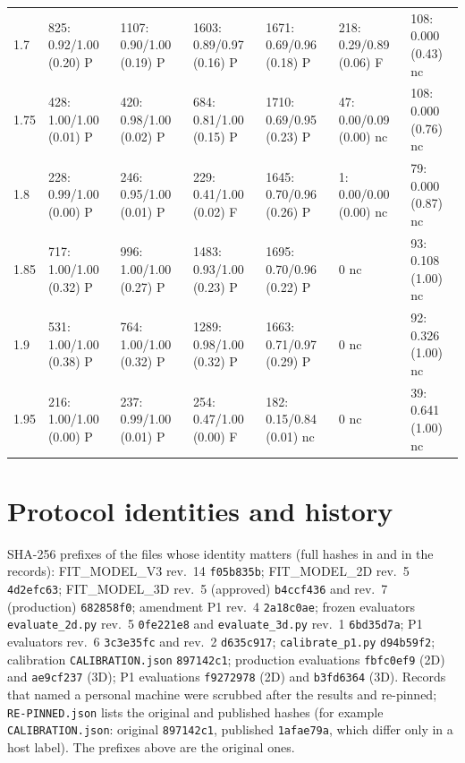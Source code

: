 \documentclass[10pt,a4paper]{article}
\newcommand{\code}[1]{\texttt{#1}}
\begin{document}
\begin{table}
\begin{tabular}{@{}lllllll@{}}
1.7 & 825: 0.92/1.00 (0.20) P & 1107: 0.90/1.00 (0.19) P & 1603: 0.89/0.97 (0.16) P & 1671: 0.69/0.96 (0.18) P & 218: 0.29/0.89 (0.06) F & 108: 0.000 (0.43) nc \\
1.75 & 428: 1.00/1.00 (0.01) P & 420: 0.98/1.00 (0.02) P & 684: 0.81/1.00 (0.15) P & 1710: 0.69/0.95 (0.23) P & 47: 0.00/0.09 (0.00) nc & 108: 0.000 (0.76) nc \\
1.8 & 228: 0.99/1.00 (0.00) P & 246: 0.95/1.00 (0.01) P & 229: 0.41/1.00 (0.02) F & 1645: 0.70/0.96 (0.26) P & 1: 0.00/0.00 (0.00) nc & 79: 0.000 (0.87) nc \\
1.85 & 717: 1.00/1.00 (0.32) P & 996: 1.00/1.00 (0.27) P & 1483: 0.93/1.00 (0.23) P & 1695: 0.70/0.96 (0.22) P & 0 nc & 93: 0.108 (1.00) nc \\
1.9 & 531: 1.00/1.00 (0.38) P & 764: 1.00/1.00 (0.32) P & 1289: 0.98/1.00 (0.32) P & 1663: 0.71/0.97 (0.29) P & 0 nc & 92: 0.326 (1.00) nc \\
1.95 & 216: 1.00/1.00 (0.00) P & 237: 0.99/1.00 (0.01) P & 254: 0.47/1.00 (0.00) F & 182: 0.15/0.84 (0.01) nc & 0 nc & 39: 0.641 (1.00) nc \\
\bottomrule\end{tabular}
\end{table}

\section{Protocol identities and history}\label{app:hashes}
SHA-256 prefixes of the files whose identity matters (full hashes in  and in the records):
FIT\_MODEL\_V3 rev.\ 14 \code{f05b835b}; FIT\_MODEL\_2D rev.\ 5 \code{4d2efc63}; FIT\_MODEL\_3D rev.\ 5 (approved) \code{b4ccf436} and rev.\ 7
(production) \code{682858f0}; amendment P1 rev.\ 4 \code{2a18c0ae}; frozen evaluators \code{evaluate\_2d.py} rev.\ 5 \code{0fe221e8} and
\code{evaluate\_3d.py} rev.\ 1 \code{6bd35d7a}; P1 evaluators rev.\ 6 \code{3c3e35fc} and rev.\ 2 \code{d635c917}; \code{calibrate\_p1.py}
\code{d94b59f2}; calibration \code{CALIBRATION.json} \code{897142c1}; production evaluations \code{fbfc0ef9} (2D) and \code{ae9cf237} (3D); P1
evaluations \code{f9272978} (2D) and \code{b3fd6364} (3D). Records that named a personal machine were scrubbed after the results and
re-pinned; \code{RE-PINNED.json} lists the original and published hashes (for example \code{CALIBRATION.json}: original \code{897142c1},
published \code{1afae79a}, which differ only in a host label). The prefixes above are the original ones.
\end{document}
